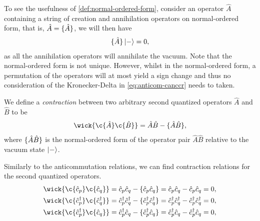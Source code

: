         To see the usefulness of \autoref{def:normal-ordered-form}, consider an
        operator $\hat{A}$ containing a string of creation and annihilation
        operators on normal-ordered form, that is, $\hat{A} = \{ \hat{A} \}$,
        we will then have
        \begin{align}
            \{ \hat{A} \}\ket{-} = 0,
        \end{align}
        as all the annihilation operators will annihilate the vacuum.
        Note that the normal-ordered form is not unique.
        However, whilst in the normal-ordered form, a permutation of the
        operators will at most yield a sign change and thus no consideration of
        the Kronecker-Delta in \autoref{eq:anticom-canccr} needs to taken.

        \begin{definition}
            \label{def:contraction}
            We define a \emph{contraction} between two arbitrary second
            quantized operators $\hat{A}$ and $\hat{B}$ to be
            \begin{align}
                \wick{
                    \c {\hat{A}}
                    \c {\hat{B}}
                }
                = \hat{A}\hat{B}
                - \normalord{\hat{A}\hat{B}},
            \end{align}
            where $\{ \hat{A}\hat{B} \}$ is the normal-ordered form of the
            operator pair $\hat{A}\hat{B}$ relative to the vacuum state
            $\ket{-}$.
        \end{definition}
        Similarly to the anticommutation relations, we can find contraction
        relations for the second quantized operators.
        \begin{gather}
            \wick{
                \c {\can{p}}
                \c {\can{q}}
            }
            = \can{p}\can{q}
            - \normalord{\can{p}\can{q}}
            = \can{p}\can{q}
            - \can{p}\can{q}
            = 0,
            \\
            \wick{
                \c {\ccr{p}}
                \c {\ccr{q}}
            }
            = \ccr{p}\ccr{q}
            - \normalord{\ccr{p}\ccr{q}}
            = \ccr{p}\ccr{q}
            - \ccr{p}\ccr{q}
            = 0,
            \\
            \wick{
                \c {\ccr{p}}
                \c {\can{q}}
            }
            = \ccr{p}\can{q}
            - \normalord{\ccr{p}\can{q}}
            = \ccr{p}\can{q}
            - \ccr{p}\can{q}
            = 0,
        \end{gather}
